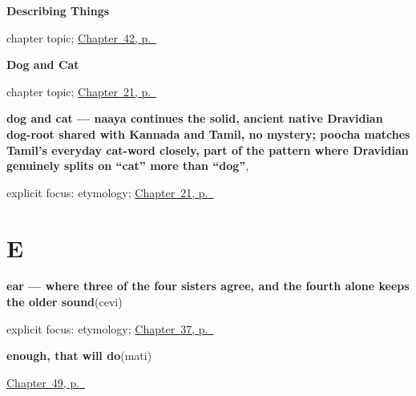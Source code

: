 \noindent\begin{minipage}[t]{\linewidth}
\raggedright
\textbf{Describing Things}\par
\footnotesize chapter topic; \hyperref[ch:ml-describing-things]{Chapter~42, p.~\pageref*{ch:ml-describing-things}}
\end{minipage}\par\smallskip

\noindent\begin{minipage}[t]{\linewidth}
\raggedright
\textbf{Dog and Cat}\par
\footnotesize chapter topic; \hyperref[ch:ml-dog-and-cat]{Chapter~21, p.~\pageref*{ch:ml-dog-and-cat}}
\end{minipage}\par\smallskip

\noindent\begin{minipage}[t]{\linewidth}
\raggedright
\textbf{dog and cat — naaya continues the solid, ancient native Dravidian dog-root shared with Kannada and Tamil, no mystery; poocha matches Tamil's everyday cat-word closely, part of the pattern where Dravidian genuinely splits on \textquotedblleft{}cat\textquotedblright{} more than \textquotedblleft{}dog\textquotedblright{}}\enspace\emph{, }\par
\footnotesize explicit focus: etymology; \hyperref[ch:ml-dog-and-cat]{Chapter~21, p.~\pageref*{ch:ml-dog-and-cat}}
\end{minipage}\par\smallskip

\section*{E}

\noindent\begin{minipage}[t]{\linewidth}
\raggedright
\textbf{ear — where three of the four sisters agree, and the fourth alone keeps the older sound}\enspace\emph{}\enspace(cevi)\par
\footnotesize explicit focus: etymology; \hyperref[ch:ml-face-words]{Chapter~37, p.~\pageref*{ch:ml-face-words}}
\end{minipage}\par\smallskip

\noindent\begin{minipage}[t]{\linewidth}
\raggedright
\textbf{enough, that will do}\enspace\emph{}\enspace(mati)\par
\footnotesize \hyperref[ch:ml-replies]{Chapter~49, p.~\pageref*{ch:ml-replies}}
\end{minipage}\par\smallskip

